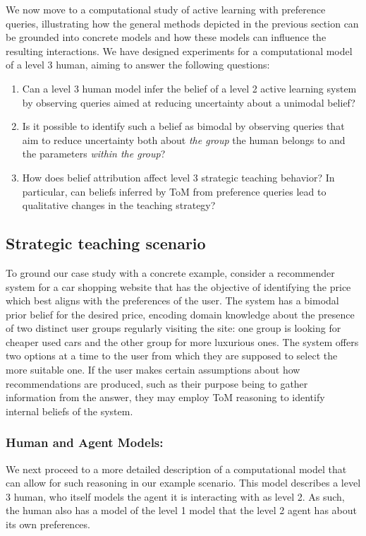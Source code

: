 \documentclass[letterpaper]{article} %
\begin{document}
We now move to a computational study of active learning with preference queries, illustrating how the general methods depicted in the previous section can be grounded into concrete models and how these models can influence the  resulting interactions. We have designed experiments for a computational model of a level 3 human, aiming to answer the following questions:

\begin{enumerate}
    \item Can a level 3 human model infer the belief of a level 2 active learning system by observing queries aimed at reducing uncertainty about a unimodal belief?
    \item Is it possible to identify such a belief as bimodal by observing queries that aim to reduce uncertainty both about \textit{the group} the human belongs to and the parameters \textit{within the group}?
    \item How does belief attribution affect level 3 strategic teaching behavior? In particular, can beliefs inferred by ToM from preference queries lead to qualitative changes in the teaching strategy?
\end{enumerate}

\subsection{Strategic teaching scenario}

To ground our case study with a concrete example, consider a recommender system for a car shopping website that has the objective of identifying the price which best aligns with the preferences of the user. The system has a bimodal prior belief for the desired price, encoding domain knowledge about the presence of two distinct user groups regularly visiting the site: one group is looking for cheaper used cars and the other group for more luxurious ones. The system offers two options at a time to the user from which they are supposed to select the more suitable one. If the user makes certain assumptions about how recommendations are produced, such as their purpose being to gather information from the answer, they may employ ToM reasoning to identify internal beliefs of the system. 

\subsubsection{Human and Agent Models:}

We next proceed to a more detailed description of a computational model that can allow for such reasoning in our example scenario. This model describes a level 3 human, who itself models the agent it is interacting with as level 2. As such, the human also has a model of the level 1 model that the level 2 agent has about its own preferences.
\end{document}
